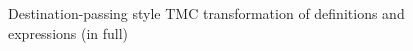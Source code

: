 \begin{figure}[tp]
    \caption{Destination-passing style TMC transformation of definitions and expressions (in full)}
    \label{fig:tmc_dps}
\end{figure}

